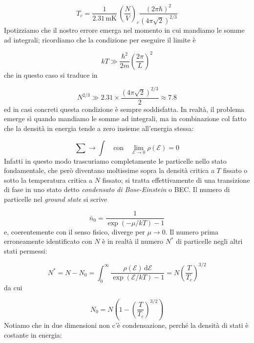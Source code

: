 \documentclass[a4paper]{report}
\begin{document}
\begin{equation}
 T_c = \frac{1}{2.31 \, \text{mK}}\,\left(\frac{N}{V}\right)_c\frac{(2\pi\hbar)^2}{(4\pi\sqrt{2})^{2/3}}
\end{equation}
Ipotizziamo che il nostro errore emerga nel momento in cui mandiamo le somme ad integrali; ricordiamo che la condizione per eseguire il limite è

\begin{equation}
    k T \gg \frac{\hbar^2}{2m} \left(\frac{2\pi}{L}\right)^2
\end{equation}
che in questo caso si traduce in

\begin{equation}
    N^{2/3} \gg 2.31 \times \frac{(4\pi\sqrt{2})^{2/3}}{2} \approx 7.8 
\end{equation}
ed in casi concreti questa condizione è sempre soddisfatta. In realtà, il problema emerge sì quando mandiamo le somme ad integrali, ma in combinazione col fatto che la densità in energia tende a zero insieme all'energia stessa:

\begin{equation}
    \sum \to \int \quad \text{con}\quad\lim_{\mathcal{E}\to 0} \rho(\mathcal{E}) = 0 
    \label{sumtoint}
\end{equation}
Infatti in questo modo trascuriamo completamente le particelle nello stato fondamentale, che però diventano moltissime sopra la densità critica a $T$ fissato o sotto la temperatura critica a $N$ fissato; si tratta effettivamente di una transizione di fase in uno stato detto \textit{condensato di Bose-Einstein} o BEC. Il numero di particelle nel \textit{ground state} si scrive

\begin{equation}
    \bar{n}_0 = \frac{1}{\exp(-\mu/k T) - 1}
\end{equation}
e, coerentemente con il senso fisico, diverge per $\mu \to 0$. Il numero prima erroneamente identificato con $N$ è in realtà il numero $N^{*}$ di particelle negli altri stati permessi:

\begin{equation}
    N^{*} = N - N_0 = \int_{0}^{\infty} \frac{\rho(\mathcal{E})\,\mathrm{d}\mathcal{E}} {\exp (\mathcal{E}/ k T) - 1} = N \left(\frac{T}{T_c}\right)^{3/2}
\end{equation}
da cui

\begin{equation}
    N_0 = N \left(1-\left(\frac{T}{T_c}\right)^{3/2}\right)
\end{equation}
Notiamo che in due dimensioni non c'è condensazione, perché la densità di stati è costante in energia:
\end{document}
